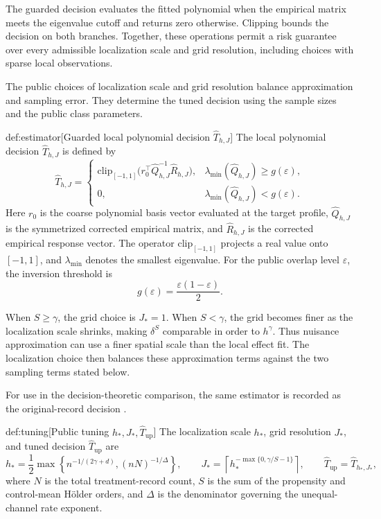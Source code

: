 \documentclass[11pt]{article}
\begin{document}
The guarded decision  evaluates the fitted polynomial when the empirical matrix meets the eigenvalue cutoff and returns zero otherwise. Clipping bounds the decision on both branches. Together, these operations permit a risk guarantee over every admissible localization scale and grid resolution, including choices with sparse local observations.

The public choices of localization scale  and grid resolution  balance approximation and sampling error. They determine the tuned decision  using the sample sizes and the public class parameters.

\begin{definitionv}{def:estimator}[Guarded local polynomial decision \(\widehat T_{h,J}\)]
The local polynomial decision \(\widehat T_{h,J}\) is defined by
\[
\widehat T_{h,J}=
\begin{cases}
\mathrm{clip}_{[-1,1]}
\bigl(r_0^\top\widehat Q_{h,J}^{-1}\widehat R_{h,J}\bigr),
&\lambda_{\min}(\widehat Q_{h,J})\ge g(\varepsilon),\\
0,
&\lambda_{\min}(\widehat Q_{h,J})<g(\varepsilon).
\end{cases}
\]
Here \(r_0\) is the coarse polynomial basis vector evaluated at the target profile, \(\widehat Q_{h,J}\) is the symmetrized corrected empirical matrix, and \(\widehat R_{h,J}\) is the corrected empirical response vector. The operator \(\mathrm{clip}_{[-1,1]}\) projects a real value onto \([-1,1]\), and \(\lambda_{\min}\) denotes the smallest eigenvalue. For the public overlap level \(\varepsilon\), the inversion threshold is
\[
g(\varepsilon)=\frac{\varepsilon(1-\varepsilon)}{2}.
\]
\end{definitionv}

When \(S\ge\gamma\), the grid choice is \(J_*=1\). When \(S<\gamma\), the grid becomes finer as the localization scale shrinks, making \(\delta^S\) comparable in order to \(h^\gamma\). Thus nuisance approximation can use a finer spatial scale than the local effect fit. The localization choice then balances these approximation terms against the two sampling terms stated below.

For use in the decision-theoretic comparison, the same estimator is recorded as the original-record decision .

\begin{definitionv}{def:tuning}[Public tuning \(h_*,J_*,\widehat T_{\mathrm{up}}\)]
The localization scale \(h_*\), grid resolution \(J_*\), and tuned decision \(\widehat T_{\mathrm{up}}\) are
\[
h_*=\frac12\max\left\{n^{-1/(2\gamma+d)},(nN)^{-1/\Delta}\right\},
\qquad
J_*=\left\lceil h_*^{-\max\{0,\gamma/S-1\}}\right\rceil,
\qquad
\widehat T_{\mathrm{up}}=\widehat T_{h_*,J_*},
\]
where \(N\) is the total treatment-record count, \(S\) is the sum of the propensity and control-mean Hölder orders, and \(\Delta\) is the denominator governing the unequal-channel rate exponent.
\end{definitionv}
\end{document}
